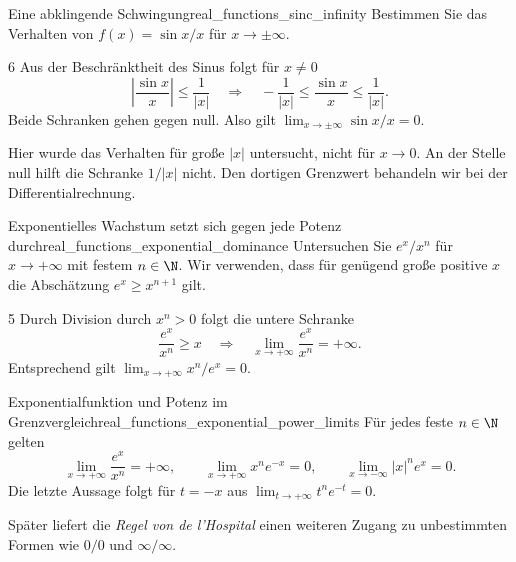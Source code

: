 \begin{ExampleBox}{Eine abklingende Schwingung}{real_functions_sinc_infinity}
  Bestimmen Sie das Verhalten von $f(x)=\sin x/x$ für $x\to\pm\infty$.
  \begin{ClozeArea}[34]{6}
    Aus der Beschränktheit des Sinus folgt für $x\ne0$
    \[
      \left|\frac{\sin x}{x}\right|\le\frac1{|x|}
      \quad\Longrightarrow\quad
      -\frac1{|x|}\le\frac{\sin x}{x}\le\frac1{|x|}.
    \]
    Beide Schranken gehen gegen null. Also gilt
    $\lim_{x\to\pm\infty}\sin x/x=0$.
  \end{ClozeArea}
  \begin{center}
  \end{center}
\end{ExampleBox}
\begin{RemarkBox}
  Hier wurde das Verhalten für große $|x|$ untersucht, nicht für $x\to0$.
  An der Stelle null hilft die Schranke $1/|x|$ nicht.
  Den dortigen Grenzwert behandeln wir bei der Differentialrechnung.
\end{RemarkBox}

\begin{ExampleBox}{Exponentielles Wachstum setzt sich gegen jede Potenz durch}{real_functions_exponential_dominance}
  Untersuchen Sie $e^x/x^n$ für $x\to+\infty$ mit festem $n\in\N$.
  Wir verwenden, dass für genügend große positive $x$ die Abschätzung
  $e^x\ge x^{n+1}$ gilt.
  \begin{ClozeArea}[34]{5}
    Durch Division durch $x^n>0$ folgt die untere Schranke
    \[
      \frac{e^x}{x^n}\ge x
      \quad\Longrightarrow\quad
      \lim_{x\to+\infty}\frac{e^x}{x^n}=+\infty.
    \]
    Entsprechend gilt $\lim_{x\to+\infty}x^n/e^x=0$.
  \end{ClozeArea}
  \begin{center}
  \end{center}
\end{ExampleBox}
\begin{KeyPointBox}{Exponentialfunktion und Potenz im Grenzvergleich}{real_functions_exponential_power_limits}
  Für jedes feste $n\in\N$ gelten
  \[
    \lim_{x\to+\infty}\frac{e^x}{x^n}=+\infty,\qquad
    \lim_{x\to+\infty}x^n e^{-x}=0,\qquad
    \lim_{x\to-\infty}|x|^n e^x=0.
  \]
  Die letzte Aussage folgt für $t=-x$ aus
  $\lim_{t\to+\infty}t^n e^{-t}=0$.
\end{KeyPointBox}
Später liefert die \emph{Regel von de l'Hospital}
 einen weiteren Zugang zu unbestimmten
Formen wie $0/0$ und $\infty/\infty$.
